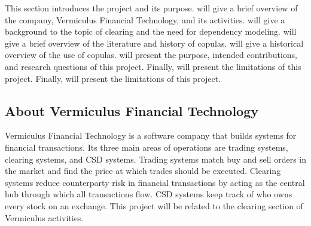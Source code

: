 
This section introduces the project and its purpose.  will give a brief overview of the company, Vermiculus Financial Technology, and its activities.  will give a background to the topic of clearing and the need for dependency modeling.  will give a brief overview of the literature  and history of copulas.  will give a historical overview of the use of copulas.  will present the purpose, intended contributions, and research questions of this project. Finally,  will present the limitations of this project. Finally,  will present the limitations of this project.

\subsection{About Vermiculus Financial Technology} \label{AboutVFT}
Vermiculus Financial Technology is a software company that builds systems for financial transactions. Its three main areas of operations are trading systems, clearing systems, and \gls{CSD} systems. Trading systems match buy and sell orders in the market and find the price at which trades should be executed. Clearing systems reduce counterparty risk in financial transactions by acting as the central hub through which all transactions flow. \gls{CSD} systems keep track of who owns every stock on an exchange. This project will be related to the clearing section of Vermiculus activities. 

